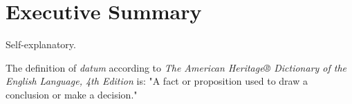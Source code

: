 \section{Executive Summary}
Self-explanatory.

The definition of \emph{datum} according to \emph{The American Heritage® Dictionary of the English Language, 4th Edition} is: "A fact or proposition used to draw a conclusion or make a decision."